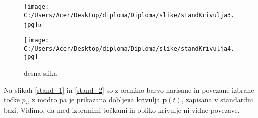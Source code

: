 \documentclass[mat1]{fmfdelo}
\newcommand{\pp}{\boldsymbol p}
\begin{document}
\begin{figure}[ht!]

\texttt{[image: C:/Users/Acer/Desktop/diploma/Diploma/slike/standKrivulja3.jpg]}{a}

\end{figure}
 \begin{figure}[ht!]
 	\texttt{[image: C:/Users/Acer/Desktop/diploma/Diploma/slike/standKrivulja4.jpg]}
 	\caption{desna slika}
 \end{figure}


Na slikah \ref{stand_1} in \ref{stand_2} so z oranžno barvo narisane in povezane izbrane točke $p_i$, z modro pa je prikazana dobljena krivulja $\pp(t)$, zapisana v standardni bazi.
Vidimo, da med izbranimi točkami in obliko krivulje ni vidne povezave. \\
\end{document}
